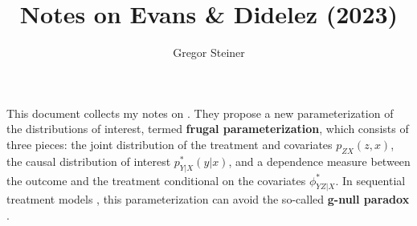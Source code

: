 \documentclass[10pt]{article}
\author{Gregor Steiner}
\title{Notes on Evans \& Didelez (2023)}
\begin{document}
\maketitle

This document collects my notes on \cite{evans_didelez_2023}. They propose a new parameterization of the distributions of interest, termed \textbf{frugal parameterization}, which consists of three pieces: the joint distribution of the treatment and covariates $p_{ZX}(z, x)$, the causal distribution of interest $p_{Y | X}^* (y|x)$, and a dependence measure between the outcome and the treatment conditional on the covariates $\phi_{YZ | X}^*$. In sequential treatment models \citep[see][Figure 2]{evans_didelez_2023}, this parameterization can avoid the so-called \textbf{g-null paradox} \citep{robins_wasserman_1997}.









\end{document}

